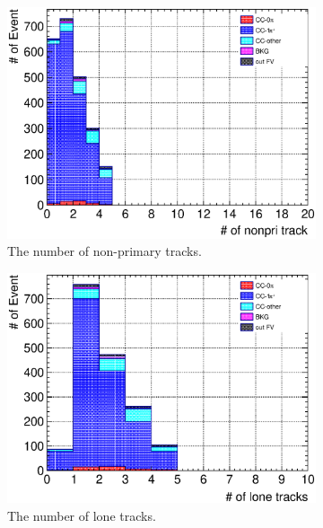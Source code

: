 \begin{figure}
  \begin{subfigure}{\dbfigwid\textwidth}
       \includegraphics[width=\textwidth]{figures/sel/TPCmu_nnonpritrk_stack_al9.eps}
       \caption{The number of non-primary tracks.}
       \label{subfig:tlpi-trknum-nonpri-cut}
  \end{subfigure}
  \begin{subfigure}{\dbfigwid\textwidth}
       \includegraphics[width=\textwidth]{figures/sel/TPCmu_nlon_stack_al9.eps}
       \caption{The number of lone tracks.}
       \label{subfig:tlpi-trknum-lone-cut}
  \end{subfigure}
  \\
  \begin{subfigure}{\dbfigwid\textwidth}

\end{subfigure}
\end{figure}
